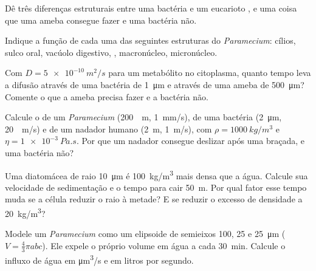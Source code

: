 \begin{exercise}[$\star$]\label{exo:b2:unicellular-diversity:3}
Dê três diferenças estruturais entre uma bactéria e um eucarioto
, e uma coisa que uma ameba consegue fazer e uma bactéria
não.
\end{exercise}

\begin{exercise}[$\star$]\label{exo:b2:unicellular-diversity:4}
Indique a função de cada uma das seguintes estruturas do
\emph{Paramecium}: cílios, sulco oral, vacúolo digestivo, , macronúcleo, micronúcleo.
\end{exercise}

\begin{exercise}[$\star\star$]\label{exo:b2:unicellular-diversity:5}
Com $D = \qty{5e-10}{m^2/s}$ para um metabólito no citoplasma, quanto
tempo leva a difusão através de uma bactéria de \qty{1}{\micro m} e
através de uma ameba de \qty{500}{\micro m}? Comente o que a ameba
precisa fazer e a bactéria não.
\end{exercise}

\begin{exercise}[$\star\star$]\label{exo:b2:unicellular-diversity:6}
Calcule o  de um \emph{Paramecium} (\qty{200}{\micro
m}, \qty{1}{mm/s}), de uma bactéria (\qty{2}{\micro m}, \qty{20}{\micro
m/s}) e de um nadador humano (\qty{2}{m}, \qty{1}{m/s}), com
$\rho = \qty{1000}{kg/m^3}$ e $\eta = \qty{1e-3}{Pa.s}$. Por que um
nadador consegue deslizar após uma braçada, e uma bactéria não?
\end{exercise}

\begin{exercise}[$\star\star$]\label{exo:b2:unicellular-diversity:7}
Uma diatomácea de raio \qty{10}{\micro m} é \qty{100}{kg/m^3} mais
densa que a água. Calcule sua velocidade de sedimentação e o tempo para
cair \qty{50}{m}. Por qual fator esse tempo muda se a célula reduzir o
raio à metade? E se reduzir o excesso de densidade a
\qty{20}{kg/m^3}?
\end{exercise}

\begin{exercise}[$\star\star$]\label{exo:b2:unicellular-diversity:8}
Modele um \emph{Paramecium} como um elipsoide de semieixos \num{100},
\num{25} e \qty{25}{\micro m} ($V = \tfrac{4}{3}\pi abc$). Ele expele
o próprio volume em água a cada \qty{30}{min}. Calcule o influxo de
água em \unit{\micro m^3/s} e em litros por segundo.
\end{exercise}

